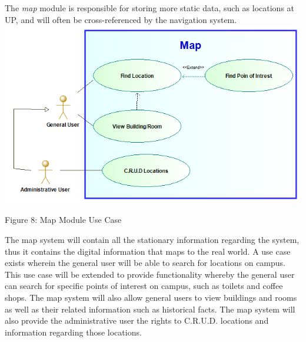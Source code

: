 The \textit{map} module is responsible for storing more static data, such as locations at UP, and will often be cross-referenced by the navigation system.  \\

\includegraphics[width=\textwidth]{images/Map_Use_Case_Diagram.png}
\begin{center}
	Figure 8: Map Module Use Case
\end{center}

	{The map system will contain all the stationary information regarding the system, thus it contains the digital information that maps to the real world. A use case exists wherein the general user will be able to search for locations on campus. This use case will be extended to provide functionality whereby the general user can search for specific points of interest on campus, such as toilets and coffee shops. The map system will also allow general users to view buildings and rooms as well as their related information such as historical facts. The map system will also provide the administrative user the rights to C.R.U.D. locations and information regarding those locations.
}